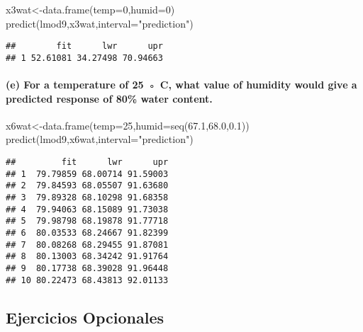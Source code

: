\documentclass[
]{article}
\newenvironment{Shaded}{\begin{snugshade}}{\end{snugshade}}
\newcommand{\AttributeTok}[1]{\textcolor[rgb]{0.77,0.63,0.00}{#1}}
\newcommand{\DecValTok}[1]{\textcolor[rgb]{0.00,0.00,0.81}{#1}}
\newcommand{\FloatTok}[1]{\textcolor[rgb]{0.00,0.00,0.81}{#1}}
\newcommand{\FunctionTok}[1]{\textcolor[rgb]{0.00,0.00,0.00}{#1}}
\newcommand{\NormalTok}[1]{#1}
\newcommand{\OtherTok}[1]{\textcolor[rgb]{0.56,0.35,0.01}{#1}}
\newcommand{\StringTok}[1]{\textcolor[rgb]{0.31,0.60,0.02}{#1}}
\begin{document}
\begin{Shaded}
\begin{Highlighting}[]
\NormalTok{x3wat}\OtherTok{\textless{}{-}}\FunctionTok{data.frame}\NormalTok{(}\AttributeTok{temp=}\DecValTok{0}\NormalTok{,}\AttributeTok{humid=}\DecValTok{0}\NormalTok{)}
\FunctionTok{predict}\NormalTok{(lmod9,x3wat,}\AttributeTok{interval=}\StringTok{"prediction"}\NormalTok{)}
\end{Highlighting}
\end{Shaded}

\begin{verbatim}
##        fit      lwr      upr
## 1 52.61081 34.27498 70.94663
\end{verbatim}

\hypertarget{e-for-a-temperature-of-25-c-what-value-of-humidity-would-give-a-predicted-response-of-80-water-content.}{%
\paragraph{(e) For a temperature of 25 ◦ C, what value of humidity would
give a predicted response of 80\% water
content.}\label{e-for-a-temperature-of-25-c-what-value-of-humidity-would-give-a-predicted-response-of-80-water-content.}}

\begin{Shaded}
\begin{Highlighting}[]
\NormalTok{x6wat}\OtherTok{\textless{}{-}}\FunctionTok{data.frame}\NormalTok{(}\AttributeTok{temp=}\DecValTok{25}\NormalTok{,}\AttributeTok{humid=}\FunctionTok{seq}\NormalTok{(}\FloatTok{67.1}\NormalTok{,}\FloatTok{68.0}\NormalTok{,}\FloatTok{0.1}\NormalTok{))}
\FunctionTok{predict}\NormalTok{(lmod9,x6wat,}\AttributeTok{interval=}\StringTok{"prediction"}\NormalTok{)}
\end{Highlighting}
\end{Shaded}

\begin{verbatim}
##         fit      lwr      upr
## 1  79.79859 68.00714 91.59003
## 2  79.84593 68.05507 91.63680
## 3  79.89328 68.10298 91.68358
## 4  79.94063 68.15089 91.73038
## 5  79.98798 68.19878 91.77718
## 6  80.03533 68.24667 91.82399
## 7  80.08268 68.29455 91.87081
## 8  80.13003 68.34242 91.91764
## 9  80.17738 68.39028 91.96448
## 10 80.22473 68.43813 92.01133
\end{verbatim}

\hypertarget{ejercicios-opcionales}{%
\subsection{Ejercicios Opcionales}\label{ejercicios-opcionales}}
\end{document}
